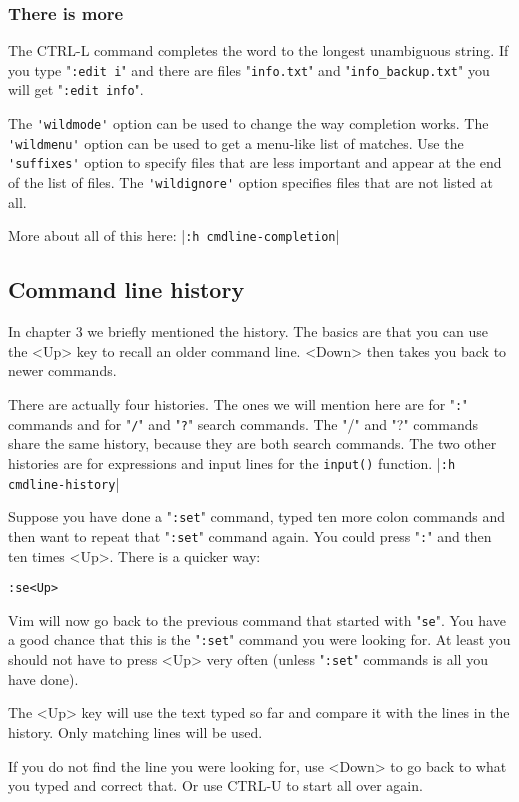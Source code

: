 \subsubsection{There is more}
The CTRL-L command completes the word to the longest unambiguous string.
If you type "\verb!:edit i!" and there are files "\verb!info.txt!" and "\verb!info_backup.txt!" you will get "\verb!:edit info!".

The \verb!'wildmode'! option can be used to change the way completion works.
The \verb!'wildmenu'! option can be used to get a menu-like list of matches.
Use the \verb!'suffixes'! option to specify files that are less important and appear at the end of the list of files.
The \verb!'wildignore'! option specifies files that are not listed at all.

More about all of this here: |\verb!:h cmdline-completion!|
\subsection{Command line history}
In chapter 3 we briefly mentioned the history.
The basics are that you can use the <Up> key to recall an older command line.
<Down> then takes you back to newer commands.

There are actually four histories.
The ones we will mention here are for "\verb!:!" commands and for "\verb!/!" and "\verb!?!" search commands.
The "/" and "?" commands share the same history, because they are both search commands.
The two other histories are for expressions and input lines for the \verb!input()! function.
|\verb!:h cmdline-history!|

Suppose you have done a "\verb!:set!" command, typed ten more colon commands and then want to repeat that "\verb!:set!" command again.
You could press "\verb!:!" and then ten times <Up>.
There is a quicker way:

\begin{Verbatim}[samepage=true]
 :se<Up>
\end{Verbatim}

Vim will now go back to the previous command that started with "\verb!se!".
You have a good chance that this is the "\verb!:set!" command you were looking for.
At least you should not have to press <Up> very often (unless "\verb!:set!" commands is all you have done).

The <Up> key will use the text typed so far and compare it with the lines in the history.
Only matching lines will be used.

If you do not find the line you were looking for, use <Down> to go back to what you typed and correct that.
Or use CTRL-U to start all over again.

